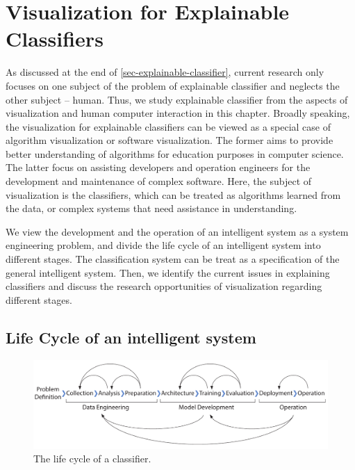 \chapter{Visualization for Explainable Classifiers}\label{sec-visualization}

As discussed at the end of \autoref{sec-explainable-classifier}, current research only focuses on one subject of the problem of explainable classifier and neglects the other subject -- human. Thus, we study explainable classifier from the aspects of visualization and human computer interaction in this chapter. Broadly speaking, the visualization for explainable classifiers can be viewed as a special case of algorithm visualization or software visualization. The former aims to provide better understanding of algorithms for education purposes in computer science. The latter focus on assisting developers and operation engineers for the development and maintenance of complex software. Here, the subject of visualization is the classifiers, which can be treated as algorithms learned from the data, or complex systems that need assistance in understanding.

We view the development and the operation of an intelligent system as a system engineering problem, and divide the life cycle of an intelligent system into different stages. The classification system can be treat as a specification of the general intelligent system. Then, we identify the current issues in explaining classifiers and discuss the research opportunities of visualization regarding different stages.

\section{Life Cycle of an intelligent system}

\begin{figure}[hb]
    \centering
    \includegraphics[width=1.0\textwidth]{figure/life-cycle}
    \caption{The life cycle of a classifier.}
    \label{fig:life-cycle}
\end{figure}


